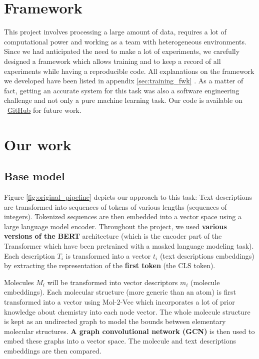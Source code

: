 \section{Framework}
\label{sec:framework_short_desc}
This project involves processing a large amount of data, requires a lot of computational power and working as a team with heterogeneous environments. Since we had anticipated the need to make a lot of experiments, we carefully designed a framework which allows training and to keep a record of all experiments while having a reproducible code. All explanations on the framework we developed have been listed in appendix \ref{sec:training_fwk} . As a matter of fact, getting an accurate system for this task was also a software engineering challenge and not only a pure machine learning task. Our code is available on ~\href{https://github.com/balthazarneveu/molecule-retrieval-using-nlp}{GitHub} for future work.

\section{Our work}

\subsection*{Base model}
Figure \ref{fig:original_pipeline} depicts our approach to this task: Text descriptions are transformed into sequences of tokens of various lengths (sequences of integers). Tokenized sequences are then embedded into a vector space using a large language model encoder. Throughout the project, we used \textbf{various versions of the BERT}\cite{bert} architecture (which is the encoder part of the Transformer \cite{transformer} which have been pretrained with a masked language modeling task). Each description $T_{i}$ is transformed into a vector $t_{i}$ (text descriptions embeddings) by extracting the representation of the \textbf{first token} (the CLS token).

Molecules $M_{i}$ will be transformed into vector descriptors $m_{i}$ (molecule embeddings). Each molecular structure (more generic than an atom) is first transformed into a vector using Mol-2-Vec \cite{mol2vec} which incorporates a lot of prior knowledge about chemistry into each node vector. The whole molecule structure is kept as an undirected graph to model the bounds between elementary molecular structures. \textbf{A graph convolutional network (GCN)} is then used to embed these graphs into a vector space. The molecule and text descriptions embeddings are then compared.


